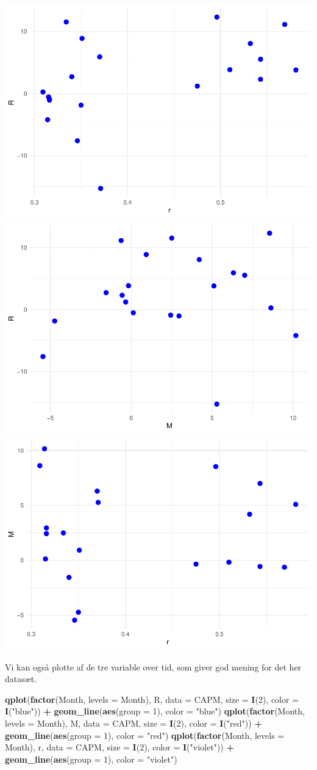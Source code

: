 \documentclass[
]{article}
\newenvironment{Shaded}{\begin{snugshade}}{\end{snugshade}}
\newcommand{\DataTypeTok}[1]{\textcolor[rgb]{0.13,0.29,0.53}{#1}}
\newcommand{\DecValTok}[1]{\textcolor[rgb]{0.00,0.00,0.81}{#1}}
\newcommand{\KeywordTok}[1]{\textcolor[rgb]{0.13,0.29,0.53}{\textbf{#1}}}
\newcommand{\NormalTok}[1]{#1}
\newcommand{\OperatorTok}[1]{\textcolor[rgb]{0.81,0.36,0.00}{\textbf{#1}}}
\newcommand{\StringTok}[1]{\textcolor[rgb]{0.31,0.60,0.02}{#1}}
\begin{document}
\includegraphics[width=0.32\linewidth]{matstatproblems20-21_files/figure-latex/unnamed-chunk-88-1}
\includegraphics[width=0.32\linewidth]{matstatproblems20-21_files/figure-latex/unnamed-chunk-88-2}
\includegraphics[width=0.32\linewidth]{matstatproblems20-21_files/figure-latex/unnamed-chunk-88-3}

Vi kan også plotte af de tre variable over tid, som giver god mening for
det her datasæt.

\begin{Shaded}
\begin{Highlighting}[]
\KeywordTok{qplot}\NormalTok{(}\KeywordTok{factor}\NormalTok{(Month, }\DataTypeTok{levels =}\NormalTok{ Month), R, }\DataTypeTok{data =}\NormalTok{ CAPM, }\DataTypeTok{size =} \KeywordTok{I}\NormalTok{(}\DecValTok{2}\NormalTok{), }\DataTypeTok{color =} \KeywordTok{I}\NormalTok{(}\StringTok{"blue"}\NormalTok{)) }\OperatorTok{+}\StringTok{ }\KeywordTok{geom_line}\NormalTok{(}\KeywordTok{aes}\NormalTok{(}\DataTypeTok{group =} \DecValTok{1}\NormalTok{), }\DataTypeTok{color =} \StringTok{"blue"}\NormalTok{)}
\KeywordTok{qplot}\NormalTok{(}\KeywordTok{factor}\NormalTok{(Month, }\DataTypeTok{levels =}\NormalTok{ Month), M, }\DataTypeTok{data =}\NormalTok{ CAPM, }\DataTypeTok{size =} \KeywordTok{I}\NormalTok{(}\DecValTok{2}\NormalTok{), }\DataTypeTok{color =} \KeywordTok{I}\NormalTok{(}\StringTok{"red"}\NormalTok{)) }\OperatorTok{+}\StringTok{ }\KeywordTok{geom_line}\NormalTok{(}\KeywordTok{aes}\NormalTok{(}\DataTypeTok{group =} \DecValTok{1}\NormalTok{), }\DataTypeTok{color =} \StringTok{"red"}\NormalTok{)}
\KeywordTok{qplot}\NormalTok{(}\KeywordTok{factor}\NormalTok{(Month, }\DataTypeTok{levels =}\NormalTok{ Month), r, }\DataTypeTok{data =}\NormalTok{ CAPM, }\DataTypeTok{size =} \KeywordTok{I}\NormalTok{(}\DecValTok{2}\NormalTok{), }\DataTypeTok{color =} \KeywordTok{I}\NormalTok{(}\StringTok{"violet"}\NormalTok{)) }\OperatorTok{+}\StringTok{ }\KeywordTok{geom_line}\NormalTok{(}\KeywordTok{aes}\NormalTok{(}\DataTypeTok{group =} \DecValTok{1}\NormalTok{), }\DataTypeTok{color =} \StringTok{"violet"}\NormalTok{)}
\end{Highlighting}
\end{Shaded}
\end{document}
